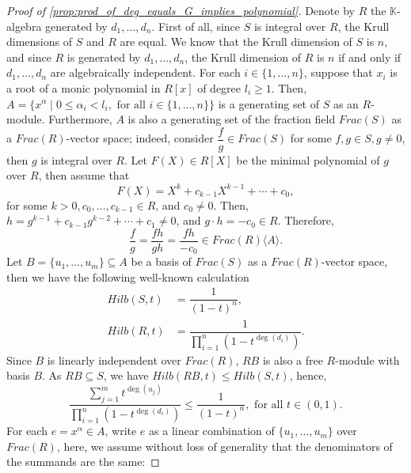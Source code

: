 \documentclass[12pt,a4paper]{report}
\theoremstyle{definition}
\theoremstyle{remark}
\theoremstyle{definition}
\begin{document}
\begin{proof}[Proof of \cref{prop:prod_of_deg_equals_G_implies_polynomial}]
    Denote by $R$ the $\mathbb{K}$-algebra generated by $d_1, \ldots, d_n$. First of all, since $S$ is integral over $R$, the Krull dimensions of $S$ and $R$ are equal. We know that the Krull dimension of $S$ is $n$, and since $R$ is generated by $d_1, \ldots, d_n$, the Krull dimension of $R$ is $n$ if and only if $d_1, \ldots, d_n$ are algebraically independent.\smallbreak
    For each $i\in \{1, \ldots, n\}$, suppose that $x_i$ is a root of a monic polynomial in $R[x]$ of degree $l_i \geq 1$. Then, $A = \{x^{\alpha}\mid 0\leq \alpha_i< l_i, \text{ for all } i\in \{1, \ldots, n\} \}$ is a generating set of $S$ as an $R$-module. Furthermore, $A$ is also a generating set of the fraction field $Frac(S)$ as a $Frac(R)$-vector space; indeed, consider $\dfrac{f}{g}\in Frac(S)$ for some $f, g\in S, g\neq 0$, then $g$ is integral over $R$. Let $F(X)\in R[X]$ be the minimal polynomial of $g$ over $R$, then assume that
    \begin{equation*}
        F(X) = X^k + c_{k-1}X^{k-1} + \cdots + c_0,
    \end{equation*}
    for some $k>0, c_0, \ldots, c_{k-1}\in R$, and $c_0\neq 0$. Then, $h = g^{k-1} + c_{k-1}g^{k-2} + \cdots +c_1 \neq 0$, and $g\cdot h = -c_0\in R$. Therefore,
    \begin{equation*}
        \dfrac{f}{g} = \dfrac{fh}{gh} = \dfrac{fh}{-c_0}\in Frac(R)\langle A\rangle.
    \end{equation*}
    Let $B = \{u_1, \ldots, u_m\}\subseteq A$ be a basis of $Frac(S)$ as a $Frac(R)$-vector space, then we have the following well-known calculation
    \begin{align*}
        Hilb(S, t) &= \dfrac{1}{(1-t)^{n}},\\
        Hilb(R, t) &= \dfrac{1}{\prod\limits_{i=1}^{n}\left(1-t^{\deg(d_i)}\right)}.
    \end{align*}
    Since $B$ is linearly independent over $Frac(R)$, $RB$ is also a free $R$-module with basis $B$. As $RB\subseteq S$, we have $Hilb(RB, t)\leq Hilb(S, t)$, hence,
    \begin{equation}\label{eq:ineq_with_basis_1}
        \dfrac{\sum\limits_{j=1}^{m}t^{\deg(u_j)}}{\prod\limits_{i=1}^{n}\left(1-t^{\deg(d_i)}\right)} \leq \dfrac{1}{(1-t)^n}, \text{ for all } t\in (0, 1).
    \end{equation}
    For each $e = x^{\alpha}\in A$, write $e$ as a linear combination of $\{u_1, \ldots, u_m\}$ over $Frac(R)$, here, we assume without loss of generality that the denominators of the summands are the same:

\end{proof}
\end{document}
